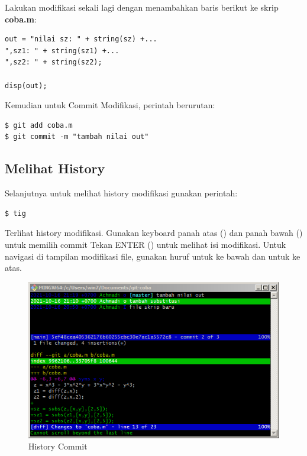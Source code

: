 \documentclass[12pt]{book}
\begin{document}
	Lakukan modifikasi sekali lagi dengan menambahkan baris berikut ke skrip \textbf{coba.m}:
	\begin{verbatim}
out = "nilai sz: " + string(sz) +...
",sz1: " + string(sz1) +...
",sz2: " + string(sz2);

disp(out);
	\end{verbatim}

	Kemudian untuk Commit Modifikasi, perintah berurutan:
	\begin{verbatim}
$ git add coba.m
$ git commit -m "tambah nilai out"
	\end{verbatim}

	\newpage
	\subsection{Melihat History}
	
	Selanjutnya untuk melihat history modifikasi gunakan perintah:
	\begin{verbatim}
$ tig
	\end{verbatim}

	Terlihat history modifikasi.
	Gunakan keyboard panah atas (\keys{$\uparrow$}) dan panah bawah (\keys{$\downarrow$}) untuk memilih commit
	Tekan ENTER (\keys{\return}) untuk melihat isi modifikasi.
	Untuk navigasi di tampilan modifikasi file, gunakan huruf  untuk ke bawah dan  untuk ke atas.
	
	\begin{figure}[!ht]
		\centering
		\includegraphics[width=400pt]{images/git10}
		\caption{History Commit}
	\end{figure}
\end{document}
